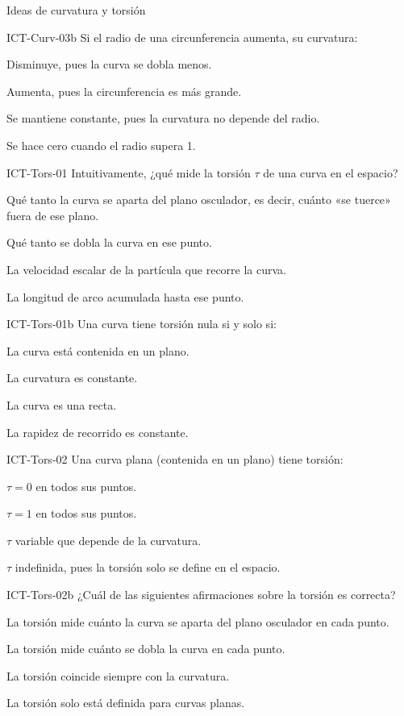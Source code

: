\documentclass[a4,11pt]{aleph-notas}
\begin{document}
\begin{quiz}{Ideas de curvatura y torsión}
\begin{multi}[]%
    {ICT-Curv-03b}
    Si el radio de una circunferencia aumenta, su curvatura:
    \item* Disminuye, pues la curva se dobla menos.
    \item Aumenta, pues la circunferencia es más grande.
    \item Se mantiene constante, pues la curvatura no depende del radio.
    \item Se hace cero cuando el radio supera 1.
\end{multi}

\begin{multi}[]%
    {ICT-Tors-01}
    Intuitivamente, ¿qué mide la torsión $\tau$ de una curva en el espacio?
    \item* Qué tanto la curva se aparta del plano osculador, es decir, cuánto «se tuerce» fuera de ese plano.
    \item Qué tanto se dobla la curva en ese punto.
    \item La velocidad escalar de la partícula que recorre la curva.
    \item La longitud de arco acumulada hasta ese punto.
\end{multi}

\begin{multi}[]%
    {ICT-Tors-01b}
    Una curva tiene torsión nula si y solo si:
    \item* La curva está contenida en un plano.
    \item La curvatura es constante.
    \item La curva es una recta.
    \item La rapidez de recorrido es constante.
\end{multi}

\begin{multi}[]%
    {ICT-Tors-02}
    Una curva plana (contenida en un plano) tiene torsión:
    \item* $\tau=0$ en todos sus puntos.
    \item $\tau=1$ en todos sus puntos.
    \item $\tau$ variable que depende de la curvatura.
    \item $\tau$ indefinida, pues la torsión solo se define en el espacio.
\end{multi}

\begin{multi}[]%
    {ICT-Tors-02b}
    ¿Cuál de las siguientes afirmaciones sobre la torsión es correcta?
    \item* La torsión mide cuánto la curva se aparta del plano osculador en cada punto.
    \item La torsión mide cuánto se dobla la curva en cada punto.
    \item La torsión coincide siempre con la curvatura.
    \item La torsión solo está definida para curvas planas.
\end{multi}


\end{quiz}
\end{document}

